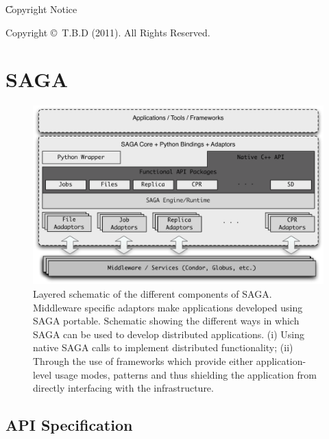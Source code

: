     \U{Copyright Notice}

  Copyright \copyright~T.B.D (2011).  All Rights
  Reserved.\\

  \newpage

  \tableofcontents

  \newpage

                                        
\section {SAGA}

\begin{figure}
    \includegraphics[width=1.0\textwidth]{./figures/figure_02}
    \caption{\footnotesize Layered schematic of the different components
    of SAGA.  Middleware specific adaptors make applications developed
    using SAGA portable.  Schematic showing the different ways in which
    SAGA can be used to develop distributed applications. (i) Using
    native SAGA calls to implement distributed functionality; (ii)
    Through the use of frameworks which provide either application-level
    usage modes, patterns and thus shielding the application from
    directly interfacing with the infrastructure.} \label{sagalayer}
\end{figure}
	
	
\subsection{API Specification}	

